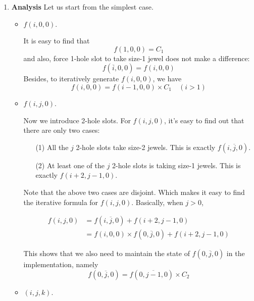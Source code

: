 \documentclass[a4paper,12pt]{article}
\begin{document}
\begin{enumerate}
\item \textbf{Analysis}
  Let us start from the simplest case. 
  \begin{itemize}
  \item $f(i, 0, 0)$. 


    It is easy to find that 
    \begin{equation}
      \label{eq:f100}
      f(1, 0, 0) = C_1
    \end{equation}
    and also, force 1-hole slot to take size-1 jewel does not make a
    difference:
    \begin{equation}
      f(\overline{i}, 0, 0) = f(i, 0, 0)
    \end{equation}
    Besides, to iteratively generate $f(i, 0, 0)$, we have
    \begin{equation}
      f(i, 0, 0) = f(i-1, 0, 0) \times C_1 \quad (i > 1)
    \end{equation}


  \item $f(i, j, 0)$.
    
    Now we introduce 2-hole slots. For $f(i, j, 0)$, it's easy to find
    out that there are only two cases:
    \begin{itemize}
    \item[(1)] All the $j$ 2-hole slots take size-2 jewels. This is
      exactly $f(i, \overline{j}, 0)$.
    \item[(2)] At least one of the $j$ 2-hole slots is taking size-1
      jewels. This is exactly $f(i + 2, j-1, 0)$.
    \end{itemize}

    Note that the above two cases are disjoint. Which makes it easy to
    find the iterative formula for $f(i, j, 0)$. Basically, when $j >
    0$,
    
    \begin{align}
      f(i, j, 0) &= f(i, \overline{j}, 0) + f(i + 2, j -1 , 0) \\
      &= f(i, 0, 0) \times f(0, \overline{j}, 0) + f(i + 2, j - 1, 0) 
    \end{align}
    
    This shows that we also need to maintain the state of $f(0,
    \overline{j}, 0)$ in the implementation, namely
    \begin{equation}
      \label{eq:f0j0}
      f(0, \overline{j}, 0) = f(0, \overline{j - 1}, 0) \times C_2
    \end{equation}

  \item $(i, j, k)$.


\end{itemize}
\end{enumerate}
\end{document}
